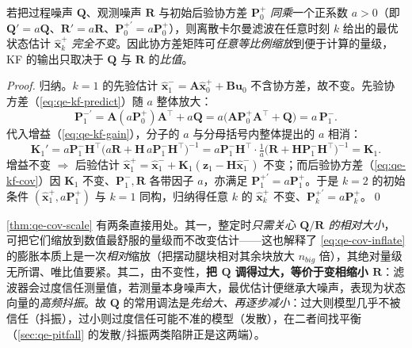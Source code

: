 \begin{theorem}[协方差等比例缩放不变性]\label{thm:qe-cov-scale}
若把过程噪声 $\mathbf{Q}$、观测噪声 $\mathbf{R}$ 与初始后验协方差 $\mathbf{P}_0^+$ \emph{同乘}一个正系数 $a>0$（即 $\mathbf{Q}'=a\mathbf{Q}$、$\mathbf{R}'=a\mathbf{R}$、$\mathbf{P}_0^{+\prime}=a\mathbf{P}_0^+$），则离散卡尔曼滤波在任意时刻 $k$ 给出的最优状态估计 $\hat{\boldsymbol x}_k^+$ \emph{完全不变}。因此协方差矩阵可\emph{任意等比例缩放}到便于计算的量级，KF 的输出只取决于 $\mathbf{Q}$ 与 $\mathbf{R}$ 的\emph{比值}。
\end{theorem}
\begin{proof}
归纳。$k=1$ 的先验估计 $\hat{\boldsymbol x}_1^-=\mathbf{A}\hat{\boldsymbol x}_0^++\mathbf{B}\boldsymbol u_0$ 不含协方差，故不变。先验协方差（\cref{eq:qe-kf-predict}）随 $a$ 整体放大：
\begin{equation}
  \mathbf{P}_1^{-\prime}=\mathbf{A}(a\mathbf{P}_0^+)\mathbf{A}^\top+a\mathbf{Q}=a\big(\mathbf{A}\mathbf{P}_0^+\mathbf{A}^\top+\mathbf{Q}\big)=a\,\mathbf{P}_1^-.
  \label{eq:qe-scale-P}
\end{equation}
代入增益（\cref{eq:qe-kf-gain}），分子的 $a$ 与分母括号内整体提出的 $a$ 相消：
\begin{equation}
  \mathbf{K}_1'=a\mathbf{P}_1^-\mathbf{H}^\top\big(a\mathbf{R}+\mathbf{H}\,a\mathbf{P}_1^-\mathbf{H}^\top\big)^{-1}
  =a\mathbf{P}_1^-\mathbf{H}^\top\cdot\tfrac1a\big(\mathbf{R}+\mathbf{H}\mathbf{P}_1^-\mathbf{H}^\top\big)^{-1}=\mathbf{K}_1.
  \label{eq:qe-scale-K}
\end{equation}
增益不变 $\Rightarrow$ 后验估计 $\hat{\boldsymbol x}_1^+=\hat{\boldsymbol x}_1^-+\mathbf{K}_1(\boldsymbol z_1-\mathbf{H}\hat{\boldsymbol x}_1^-)$ 不变；而后验协方差（\cref{eq:qe-kf-cov}）因 $\mathbf{K}_1$ 不变、$\mathbf{P}_1^-,\mathbf{R}$ 各带因子 $a$，亦满足 $\mathbf{P}_1^{+\prime}=a\mathbf{P}_1^+$。于是 $k=2$ 的初始条件 $(\hat{\boldsymbol x}_1^+,a\mathbf{P}_1^+)$ 与 $k=1$ 同构，归纳得任意 $k$ 的 $\hat{\boldsymbol x}_k^+$ 不变、$\mathbf{P}_k^{+\prime}=a\mathbf{P}_k^+$。\qed
\end{proof}

\begin{note}\label{note:qe-cov-ratio}
\cref{thm:qe-cov-scale} 有两条直接用处。其一，整定时\emph{只需关心 $\mathbf{Q}/\mathbf{R}$ 的相对大小}，可把它们缩放到数值最舒服的量级而不改变估计——这也解释了 \cref{eq:qe-cov-inflate} 的膨胀本质上是一次\emph{相对}缩放（把摆动腿块相对其余块放大 $n_{big}$ 倍），其绝对量级无所谓、唯比值要紧。其二，由不变性，\textbf{把 $\mathbf{Q}$ 调得过大，等价于变相缩小 $\mathbf{R}$}：滤波器会过度信任测量值，若测量本身噪声大，最优估计便继承大噪声，表现为状态向量的\emph{高频抖振}。故 $\mathbf{Q}$ 的常用调法是\emph{先给大、再逐步减小}：过大则模型几乎不被信任（抖振），过小则过度信任可能不准的模型（发散），在二者间找平衡（\cref{sec:qe-pitfall} 的发散/抖振两类陷阱正是这两端）。
\end{note}

